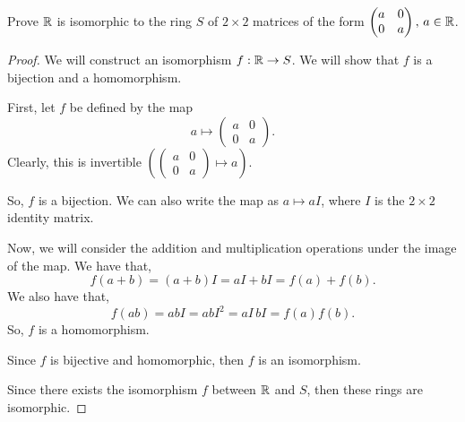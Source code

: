 \documentclass[../hw4]{subfiles}
\begin{document}
\begin{problem}
Prove $\mathbb{R}$ is isomorphic to the ring $S$ of  $2\times 2$ matrices of the form $\begin{pmatrix} a&0\\0&a \end{pmatrix},\, a\in \mathbb{R}$.
\end{problem}
\begin{proof}
	We will construct an isomorphism $f:\mathbb{R}\to S$.
	We will show that $f$ is a bijection and a homomorphism.

	First, let $f$ be defined by the map  \[
		a \mapsto \begin{pmatrix} a&0\\0&a \end{pmatrix}
		.\]
	Clearly, this is invertible $\left(  \begin{pmatrix} a&0\\0&a \end{pmatrix} \mapsto a \right) $.

	So, $f$ is a bijection.
	We can also write the map as $a \mapsto aI$, where $I$ is the  $2\times 2$ identity matrix.

	Now, we will consider the addition and multiplication operations under the image of the map.
	We have that, \[
		f(a+b)=(a+b)I = aI+bI = f(a)+f(b)
		.\]
	We also have that,
	\[
		f(ab)=abI = abI^2 = aI\,bI=f(a)f(b)
		.\]
	So, $f$ is a homomorphism.

	Since  $f$ is bijective and homomorphic, then  $f$ is an isomorphism.

	Since there exists the isomorphism  $f$ between $\mathbb{R}$ and $S$, then these rings are isomorphic.
\end{proof}
\end{document}
